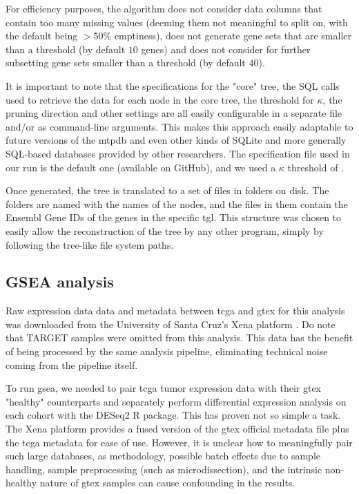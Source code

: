 For efficiency purposes, the algorithm does not consider data columns that
contain too many missing values (deeming them not meaningful to split on, with
the default being $> 50\%$ emptiness), does not generate gene sets that are
smaller than a threshold (by default $10$ genes) and does not consider for
further subsetting gene sets smaller than a threshold (by default $40$).

It is important to note that the specifications for the "core" tree, the SQL
calls used to retrieve the data for each node in the core tree, the threshold
for $\kappa$, the pruning direction and other settings are all easily
configurable in a separate file and/or as command-line arguments. This makes
this approach easily adaptable to future versions of the \gls{mtpdb} and even
other kinds of SQLite and more generally SQL-based databases provided by other
researchers. The specification file used in our run is the default one
(available on GitHub), and we used a $\kappa$ threshold of .

Once generated, the tree is translated to a set of files in folders on disk. The
folders are named with the names of the nodes, and the  files in
them contain the Ensembl Gene IDs of the genes in the specific \gls{tgl}. This
structure was chosen to easily allow the reconstruction of the tree by any other
program, simply by following the tree-like file system paths.

\subsection{GSEA analysis}
Raw expression data data and metadata between \gls{tcga} and \gls{gtex} for this
analysis was downloaded from the University of Santa Cruz's Xena platform
\cite{UCSCXena}. Do note that TARGET samples were omitted from this analysis.
This data has the benefit of being processed by the same analysis pipeline,
eliminating technical noise coming from the pipeline itself.

To run \gls{gsea}, we needed to pair \gls{tcga} tumor expression data with their
\gls{gtex} "healthy" counterparts and separately perform differential expression
analysis on each cohort with the DESeq2 R package. This has proven not so simple
a task. The Xena platform provides a fused version of the \gls{gtex} official
metadata file plus the \gls{tcga} metadata for ease of use. However, it is
unclear how to meaningfully pair such large databases, as methodology, possible
batch effects due to sample handling, sample preprocessing (such as
microdissection), and the intrinsic non-healthy nature of \gls{gtex} samples can
cause confounding in the results. 

